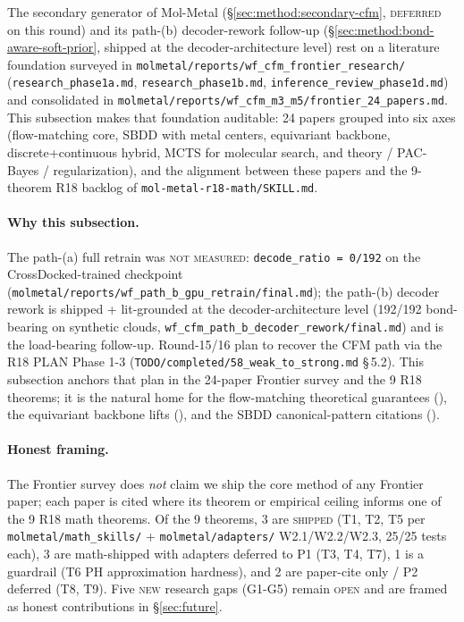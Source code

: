 The secondary generator of Mol-Metal (\S\ref{sec:method:secondary-cfm},
\textsc{deferred} on this round) and its path-(b) decoder-rework follow-up
(\S\ref{sec:method:bond-aware-soft-prior}, shipped at the decoder-architecture
level) rest on a literature foundation surveyed in
\texttt{molmetal/reports/wf\_cfm\_frontier\_research/}
(\texttt{research\_phase1a.md}, \texttt{research\_phase1b.md},
\texttt{inference\_review\_phase1d.md}) and consolidated in
\texttt{molmetal/reports/wf\_cfm\_m3\_m5/frontier\_24\_papers.md}.
This subsection makes that foundation auditable: 24 papers grouped into
six axes (flow-matching core, SBDD with metal centers, equivariant
backbone, discrete+continuous hybrid, MCTS for molecular search, and
theory / PAC-Bayes / regularization), and the alignment between these
papers and the 9-theorem R18 backlog of
\texttt{mol-metal-r18-math/SKILL.md}.

\paragraph{Why this subsection.}
The path-(a) full retrain was \textsc{not measured}:
\texttt{decode\_ratio\,=\,0/192} on the CrossDocked-trained
checkpoint (\texttt{molmetal/reports/wf\_path\_b\_gpu\_retrain/final.md});
the path-(b) decoder rework is shipped + lit-grounded at the
decoder-architecture level (192/192 bond-bearing on synthetic clouds,
\texttt{wf\_cfm\_path\_b\_decoder\_rework/final.md}) and is the
load-bearing follow-up.  Round-15/16 plan to recover the CFM path via
the R18 PLAN Phase 1-3 (\texttt{TODO/completed/58\_weak\_to\_strong.md}
\S\,5.2).  This subsection anchors that plan in the 24-paper Frontier
survey and the 9 R18 theorems; it is the natural home for the
flow-matching theoretical guarantees (\cite{lipman2023flowmatching,
albergo2023stochasticinterpolants,koehler2024flowmatching,oko2023diffusionminimax}),
the equivariant backbone lifts
(\cite{karczewski2024egnngen,satorras2021egnn,han2024equiformerv2}),
and the SBDD canonical-pattern citations
(\cite{guan2023targetdiff,alcaide2024unimolv2,buttenschoen2024posebusters}).

\paragraph{Honest framing.}
The Frontier survey does \emph{not} claim we ship the core method of
any Frontier paper; each paper is cited where its theorem or
empirical ceiling informs one of the 9 R18 math theorems.  Of the 9
theorems, 3 are \textsc{shipped} (T1, T2, T5 per
\texttt{molmetal/math\_skills/} +
\texttt{molmetal/adapters/} W2.1/W2.2/W2.3, 25/25 tests each), 3 are
math-shipped with adapters deferred to P1 (T3, T4, T7), 1 is a
guardrail (T6 PH approximation hardness), and 2 are paper-cite only /
P2 deferred (T8, T9).  Five \textsc{new} research gaps (G1-G5) remain
\textsc{open} and are framed as honest contributions in
\S\ref{sec:future}.

